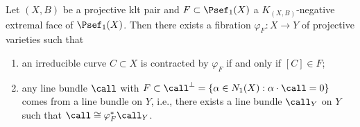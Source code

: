     \begin{theorem}\label{thm: contraction theorem}
        Let \((X,B)\) be a projective klt pair and \(F \subset \Psef_1(X)\) a \(K_{(X,B)}\)-negative extremal face of \(\Psef_1(X)\).
        Then there exists a fibration \(\varphi_F: X \to Y\) of projective varieties such that
        \begin{enumerate}
            \item an irreducible curve \(C \subset X\) is contracted by \(\varphi_F\) if and only if \([C] \in F\);
            \item any line bundle \(\call\) with \(F \subset \call^{\perp} = \{\alpha \in N_1(X) : \alpha \cdot \call = 0\}\) comes from a line bundle on \(Y\), 
                i.e., there exists a line bundle \(\call_Y\) on \(Y\) such that \(\call \cong \varphi_F^* \call_Y\).
        \end{enumerate}
    \end{theorem}

    